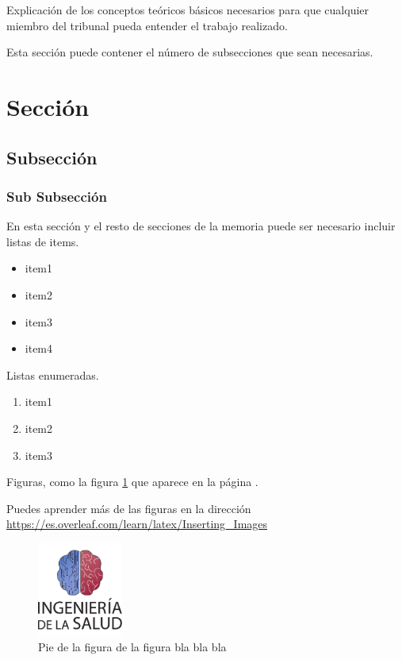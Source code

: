 

Explicación de los conceptos teóricos básicos necesarios para que cualquier miembro del tribunal pueda entender el trabajo realizado.

Esta sección puede contener el número de subsecciones que sean necesarias.

\section{Sección}

\subsection{Subsección}

\subsubsection{Sub Subsección}

En esta sección y el resto de secciones de la memoria puede ser necesario incluir listas de items.

\begin{itemize}
    \item item1
    \item item2
    \item item3
    \item item4
\end{itemize}

Listas enumeradas.

\begin{enumerate}
    \item item1
    \item item2
    \item item3
\end{enumerate}

Figuras, como la figura \ref{fig:escudo} que aparece en la página \pageref{fig:escudo}. 

Puedes aprender más de las figuras en la dirección \url{https://es.overleaf.com/learn/latex/Inserting_Images}

\begin{figure}[h]
    \centering
    \includegraphics[width=0.25\textwidth]{img/escudoSalud.pdf}
    \caption{Pie de la figura de la figura bla bla bla}
    \label{fig:escudo}
\end{figure}


